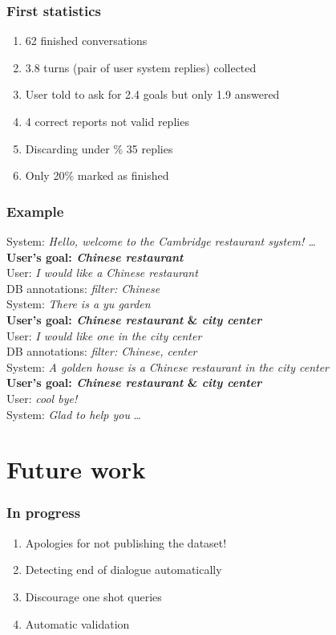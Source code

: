 \documentclass[10pt, compress,british,xcolor={svgnames,dvipsnames,x11names},trans]{beamer}
\def\sys#1{{\color{purple}System: \it #1}}
\def\usr#1{{\color{brown}User: \it #1}}
\def\api#1{{\color{blue}DB annotations: \it #1}}
\begin{document}
\begin{frame}\frametitle{First statistics}
    \begin{enumerate}
        \item 62 finished conversations
        \item 3.8 turns (pair of user system replies) collected
        \item User told to ask for 2.4 goals but only 1.9 answered 
        \item 4 correct reports not valid replies
        \item Discarding under \% 35 replies
        \item Only 20\% marked as finished 
    \end{enumerate}
\end{frame}

\begin{frame}\frametitle{Example}
    \sys{Hello, welcome to the Cambridge restaurant system! \dots } \\
    {\bf User's goal: {\it Chinese restaurant}} \\
    \usr{I would like a Chinese restaurant} \\
    \api{filter: Chinese} \\
    \sys{There is a yu garden} \\
    {\bf User's goal: {\it Chinese restaurant} \& {\it city center}} \\
    \usr{I would like one in the city center} \\
    \api{filter: Chinese, center} \\
    \sys{A golden house is a Chinese restaurant in the city center} \\
    {\bf User's goal: {\it Chinese restaurant} \& {\it city center}} \\
    \usr{cool bye!} \\
    \sys{Glad to help you}
    \dots
\end{frame}

\section{Future work}

\begin{frame}\frametitle{In progress}
    \begin{enumerate}
        \item Apologies for not publishing the dataset!
        \item Detecting end of dialogue automatically
        \item Discourage one shot queries
        \item Automatic validation
    \end{enumerate}
\end{frame}
\end{document}
